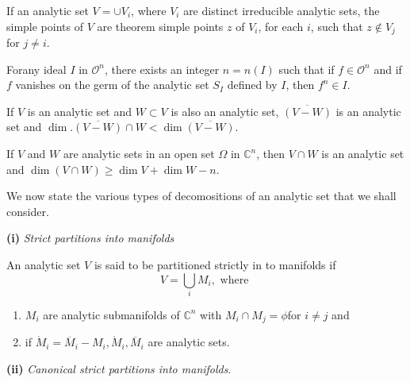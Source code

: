 \setcounter{remark}{2}
\begin{remark}\label{chap1-rem3}%
  If an analytic set $V = \cup V_{i}$, where $V_{i}$ are distinct
  irreducible analytic sets, the simple points of $V$ are theorem
  simple points $z$ of $V_{i}$, for each $i$, such that $z \notin
  V_{j}$ for $j \neq i$. 
\end{remark}

\begin{theorem}\label{chap1-thm7}  %
  For\pageoriginale  any  ideal $I$ in $ \mathscr{O} ^n$, there exists
  an integer $n  = n(I)$ such that if $f \in  \mathscr{O}^n$ and if
  $f$ vanishes  on 
  the germ of  the analytic set $S_I$ defined by $I$, then $f^n \in
  I$.  
\end{theorem}

\begin{proposition}\label{chap1-prop4}  %
  If  $V$ is an analytic set and $W \subset V$ is also an analytic
  set, $\overline{(V-W)}$ is an analytic set and
  $\dim. \overline{(V-W)} \cap W < \dim \overline{(V-W)}$. 
\end{proposition}

\begin{proposition}\label{chap1-prop5}  %
  If $V$ and $W$ are analytic sets in  an open  set $\Omega$ in
  $\mathbb{C}^n$, then $V \cap W$ is an analytic set and $\dim (V \cap
  W) \ge \dim  V+ \dim W-n$. 
\end{proposition}

We now state the various types of decomositions  of an analytic set
that we shall consider. 

{\bf (i)}  \textit{Strict partitions  into manifolds}

\setcounter{definition}{9}
\begin{definition}\label{chap1-defin10} %
  An analytic set $V$ is said to be partitioned  strictly in to manifolds if 
  $$
  V = \underset{i}{\bigcup} M_i, \text{  where  }
  $$
  \begin{enumerate}
  \item $M_i$ are analytic submanifolds of $\mathbb{C}^n$ with $M_i
    \cap M_j = \phi $for $i \neq  j $  and 
  \item if $\dot{M}_i = \overline{M}_i - M_i, \dot{M}_i,
    \overline{M}_i$ are analytic sets. 
  \end{enumerate}
\end{definition}

{\bf (ii)}  \textit{Canonical  strict partitions into manifolds}.


